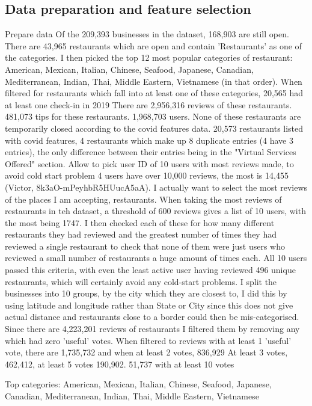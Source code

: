 \documentclass[conference]{IEEEtran}
\begin{document}
\subsection{Data preparation and feature selection}
Prepare data
Of the 209,393 businesses in the dataset, 168,903 are still open. 
There are 43,965 restaurants which are open and contain 'Restaurants' as one of the categories. 
I then picked the top 12 most popular categories of restaurant: American, Mexican, Italian, Chinese, 
Seafood, Japanese, Canadian, Mediterranean, Indian, Thai, Middle Eastern, Vietnamese (in that order). 
When filtered for restaurants which fall into at least one of these categories, 
20,565 had at least one check-in in 2019
There are 2,956,316 reviews of these restaurants. 
481,073 tips for these restaurants. 
1,968,703 users. 
None of these restaurants are temporarily closed according to the covid features data. 
20,573 restaurants listed with covid features, 4 restaurants which make up 8 duplicate entries 
(4 have 3 entries), the only difference between their entries being in the 
"Virtual Services Offered" section. 
Allow to pick user ID of 10 users with most reviews made, to avoid cold start problem
4 users have over 10,000 reviews, the most is 14,455 (Victor, 8k3aO-mPeyhbR5HUucA5aA). 
I actually want to select the most reviews of the places I am accepting, restaurants. 
When taking the most reviews of restaurants in teh dataset, a threshold of 600 reviews gives a list of 10 users, 
with the most being 1747. 
I then checked each of these for how many different restaurants they had reviewed and the greatest number of times 
they had reviewed a single restaurant to check that none of them were just users who reviewed a small number of 
restaurants a huge amount of times each. 
All 10 users passed this criteria, with even the least active user having reviewed 496 unique restaurants, which will 
certainly avoid any cold-start problems. 
I split the businesses into 10 groups, by the city which they are closest to, I did this by using latitude and 
longitude rather than State or City since this does not give actual distance and restaurants close to a border 
could then be mis-categorised. 
Since there are 4,223,201 reviews of restaurants I filtered them by removing any which had zero 'useful' votes. 
When filtered to reviews with at least 1 'useful' vote, there are 1,735,732 and when at least 2 votes, 836,929
At least 3 votes, 462,412, at least 5 votes 190,902. 
51,737 with at least 10 votes

Top categories: American, Mexican, Italian, Chinese, Seafood, Japanese, Canadian, Mediterranean, Indian, Thai, Middle Eastern, Vietnamese
\end{document}
